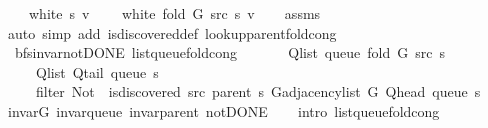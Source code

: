 \begin{isabellebody}
\ \ \ {\isachardoublequoteopen}{\isasymnot}\ white\ s\ v{\isachardoublequoteclose}\isanewline
\ \ \ {\isachardoublequoteopen}{\isasymnot}\ white\ {\isacharparenleft}{\kern0pt}fold\ G\ src\ s{\isacharparenright}{\kern0pt}\ v{\isachardoublequoteclose}\isanewline
%
\isadelimproof
\ \ %
\endisadelimproof
%
\isatagproof
{}\isamarkupfalse%
\ assms\isanewline
\ \ \isamarkupfalse%
\ {\isacharparenleft}{\kern0pt}auto\ simp\ add{\isacharcolon}{\kern0pt}\ is{\isacharunderscore}{\kern0pt}discovered{\isacharunderscore}{\kern0pt}def\ lookup{\isacharunderscore}{\kern0pt}parent{\isacharunderscore}{\kern0pt}fold{\isacharunderscore}{\kern0pt}cong{\isacharparenright}{\kern0pt}%
\endisatagproof
{\isafoldproof}%
%
\isadelimproof
\isanewline
%
\endisadelimproof
\isanewline
{}\isamarkupfalse%
\ {\isacharparenleft}{\kern0pt}\ bfs{\isacharunderscore}{\kern0pt}invar{\isacharunderscore}{\kern0pt}not{\isacharunderscore}{\kern0pt}DONE{\isacharparenright}{\kern0pt}\ list{\isacharunderscore}{\kern0pt}queue{\isacharunderscore}{\kern0pt}fold{\isacharunderscore}{\kern0pt}cong{\isacharcolon}{\kern0pt}\isanewline
\ \ \isanewline
\ \ \ \ {\isachardoublequoteopen}Q{\isacharunderscore}{\kern0pt}list\ {\isacharparenleft}{\kern0pt}queue\ {\isacharparenleft}{\kern0pt}fold\ G\ src\ s{\isacharparenright}{\kern0pt}{\isacharparenright}{\kern0pt}\ {\isacharequal}{\kern0pt}\isanewline
\ \ \ \ \ Q{\isacharunderscore}{\kern0pt}list\ {\isacharparenleft}{\kern0pt}Q{\isacharunderscore}{\kern0pt}tail\ {\isacharparenleft}{\kern0pt}queue\ s{\isacharparenright}{\kern0pt}{\isacharparenright}{\kern0pt}\ {\isacharat}{\kern0pt}\isanewline
\ \ \ \ \ filter\ {\isacharparenleft}{\kern0pt}Not\ {\isasymcirc}\ is{\isacharunderscore}{\kern0pt}discovered\ src\ {\isacharparenleft}{\kern0pt}parent\ s{\isacharparenright}{\kern0pt}{\isacharparenright}{\kern0pt}\ {\isacharparenleft}{\kern0pt}G{\isachardot}{\kern0pt}adjacency{\isacharunderscore}{\kern0pt}list\ G\ {\isacharparenleft}{\kern0pt}Q{\isacharunderscore}{\kern0pt}head\ {\isacharparenleft}{\kern0pt}queue\ s{\isacharparenright}{\kern0pt}{\isacharparenright}{\kern0pt}{\isacharparenright}{\kern0pt}{\isachardoublequoteclose}\isanewline
%
\isadelimproof
\ \ %
\endisadelimproof
%
\isatagproof
{}\isamarkupfalse%
\ invar{\isacharunderscore}{\kern0pt}G\ invar{\isacharunderscore}{\kern0pt}queue\ invar{\isacharunderscore}{\kern0pt}parent\ not{\isacharunderscore}{\kern0pt}DONE\isanewline
\ \ \isamarkupfalse%
\ {\isacharparenleft}{\kern0pt}intro\ list{\isacharunderscore}{\kern0pt}queue{\isacharunderscore}{\kern0pt}fold{\isacharunderscore}{\kern0pt}cong{\isacharunderscore}{\kern0pt}{}{\isacharparenright}{\kern0pt}%

\end{isabellebody}
